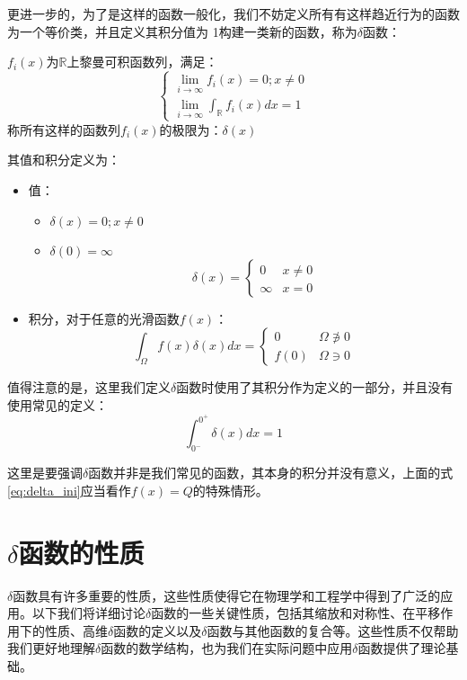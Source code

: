 \documentclass[lang=cn,10pt,newtx,bibend=biber,device=pad]{elegantbook}
\begin{document}
更进一步的，为了是这样的函数一般化，我们不妨定义所有有这样趋近行为的函数为一个等价类，并且定义其积分值为 1构建一类新的函数，称为$\delta$函数\cite{strichartz1994distribution}：
\begin{definition}[$\delta$函数]\label{def:delta_function}
${f_i(x)}$为$\mathbb{R}$上黎曼可积函数列，满足：
\begin{equation}
    \begin{cases}
        \lim_{i\rightarrow\infty}f_i(x)=0;x\neq0\\
        \lim_{i\rightarrow\infty}\int_{\mathbb{R}}f_i(x)dx = 1
    \end{cases}
\end{equation}
称所有这样的函数列${f_i(x)}$的极限为：$\delta(x)$

其值和积分定义为：
\begin{itemize}
    \item 值：
    \begin{itemize}
        \item $\delta(x) = 0;x\neq0$
        \item $\delta(0) = \infty$
        \begin{equation}
            \delta(x)=
            \begin{cases}
            0 &x\neq0 \\
            \infty &x=0
            \end{cases}
        \end{equation}
    \end{itemize}
    \item 积分，对于任意的光滑函数$f(x)$：
    \begin{equation}
        \int_{\Omega}f(x)\delta(x)dx=\begin{cases}0 & \Omega\not\owns0\\f(0)&\Omega\owns 0\end{cases}
    \end{equation}
\end{itemize}
\end{definition}
值得注意的是，这里我们定义$\delta$函数时使用了其积分作为定义的一部分，并且没有使用常见的定义：
\begin{equation}\label{eq:delta_ini}
    \int_{0^-}^{0^+}\delta(x)dx=1    
\end{equation}

这里是要强调$\delta$函数并非是我们常见的函数，其本身的积分并没有意义，上面的式\ref{eq:delta_ini}应当看作$f(x)=Q$的特殊情形。
\section{$\delta$函数的性质}
$\delta$函数具有许多重要的性质，这些性质使得它在物理学和工程学中得到了广泛的应用。以下我们将详细讨论$\delta$函数的一些关键性质，包括其缩放和对称性、在平移作用下的性质、高维$\delta$函数的定义以及$\delta$函数与其他函数的复合等。这些性质不仅帮助我们更好地理解$\delta$函数的数学结构，也为我们在实际问题中应用$\delta$函数提供了理论基础。
\end{document}
